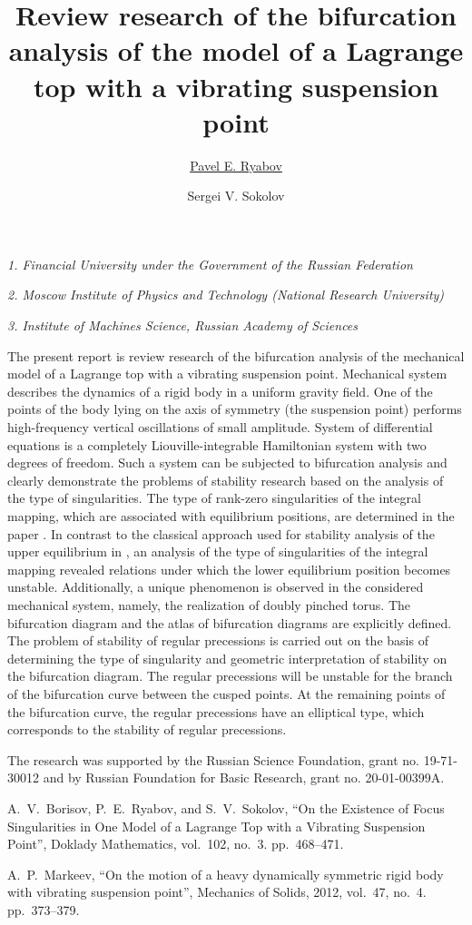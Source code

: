 \documentclass[12pt]{article}
\title{\bf\Large Review research of the bifurcation analysis of the model of a Lagrange top with a vibrating suspension point}
\author[1, 3]{\underline{Pavel E. Ryabov}}
\author[2, 3]{Sergei V. Sokolov}
\date{}
\begin{document}
	
\begin{center}
	\maketitle
	{\large\textit{1. Financial University under the Government of the Russian Federation}}
	
	{\large\textit{2. Moscow Institute of Physics and Technology (National Research University)}}
	
	{\large\textit{3. Institute of Machines Science, Russian Academy of Sciences}}
\end{center}


The present report is review research of the bifurcation analysis of the mechanical model of a Lagrange top with a vibrating suspension point.
Mechanical system  describes the dynamics of a rigid body in a uniform gravity field. One of the points of the body lying on the axis of symmetry (the suspension point) performs high-frequency vertical oscillations of small amplitude.  System of differential equations is a completely Liouville-integrable Hamiltonian system with two degrees of freedom. Such a system can be subjected to bifurcation analysis and clearly demonstrate the problems of stability research based on the analysis of the type of singularities. The type of rank-zero singularities of the integral mapping, which are associated with equilibrium positions, are determined in the paper \cite{BorRyabSok2020}. In contrast to the classical approach used for stability analysis of the upper equilibrium in \cite{Markeev2012}, an analysis of the type of singularities of the integral mapping revealed relations under which the lower equilibrium position becomes unstable. Additionally, a unique phenomenon is observed in the considered mechanical system, namely, the realization of doubly pinched torus. The bifurcation diagram and the atlas of bifurcation diagrams are explicitly defined. The problem of stability of regular precessions is carried out on the basis of determining the type of singularity and geometric interpretation of stability on the bifurcation diagram. The regular precessions will be unstable for the branch of the bifurcation curve between the cusped points. At the remaining points of the bifurcation curve, the regular precessions have an elliptical type, which corresponds to the stability of regular precessions.

The research was supported by the Russian Science Foundation, grant no. 19-71-30012 and by Russian Foundation for Basic Research, grant no. 20-01-00399A.


\begin{thebibliography}{99}
	 A.~V.~Borisov,  P.~E.~Ryabov, and S.~V.~Sokolov,
``On the Existence of Focus Singularities in One Model of a Lagrange Top with a Vibrating Suspension Point'', Doklady Mathematics, vol.~102, no.~3. pp.~468--471.

 A.~P.~Markeev, ``On the motion of a heavy dynamically symmetric rigid body with vibrating suspension point'', Mechanics of Solids, 2012, vol.~47, no.~4. pp.~373--379.
\end{thebibliography}
\end{document}
